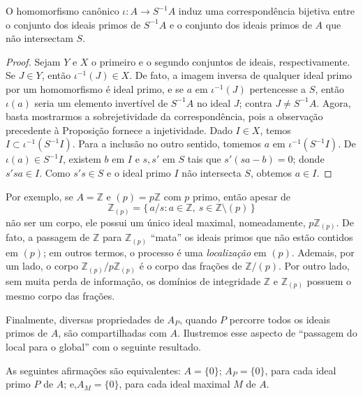 \begin{proposicao}
O homomorfismo canônico $\iota : A \to S^{-1}A$ induz uma correspondência bijetiva entre o conjunto dos ideais primos de 
$S^{-1}A$ e o conjunto dos ideais primos de $A$ que não intersectam $S$.
\end{proposicao}

\begin{proof}
Sejam $Y$ e $X$ o primeiro e o segundo conjuntos de ideais, respectivamente. Se $J \in Y$, então $\iota^{-1}(J) \in X$.
De fato, a imagem inversa de qualquer ideal primo por um homomorfismo é ideal primo, e se $a$ em $\iota^{-1}(J)$ pertencesse a $S$, 
então $\iota(a)$ seria um elemento invertível de $S^{-1}A$ no ideal $J$; contra $J \neq S^{-1}A$.
Agora, basta mostrarmos a sobrejetividade da correspondência, pois a observação precedente à Proposição fornece a injetividade.
Dado $I \in X$, temos $I \subset \iota^{-1}(S^{-1}I)$. Para a inclusão no outro sentido, tomemos $a$ em $\iota^{-1}(S^{-1}I)$.
De $\iota(a) \in S^{-1}I$, existem $b$ em $I$ e $s, s'$ em $S$ tais que $s'(sa - b) = 0$; donde $s'sa \in I$. Como $s's \in S$ 
e o ideal primo $I$ não intersecta $S$, obtemos $a \in I$.
\end{proof}

Por exemplo, se $A = \mathbb{Z}$ e $(p) = p\mathbb{Z}$ com $p$ primo, então apesar de 
\[
\mathbb{Z}_{(p)} = \{\, a/s : a \in \mathbb{Z},\ s \in \mathbb{Z} \setminus (p) \,\}
\]
não ser um corpo, ele possui um único ideal maximal, nomeadamente, $p\mathbb{Z}_{(p)}$. De fato, a passagem de 
$\mathbb{Z}$ para $\mathbb{Z}_{(p)}$ ``mata'' os ideais primos que não estão contidos em $(p)$; em outros termos, o
processo é uma \emph{localização} em $(p)$. Ademais, por um lado, o corpo $\mathbb{Z}_{(p)}/p\mathbb{Z}_{(p)}$ é o corpo 
das frações de $\mathbb{Z}/(p)$. Por outro lado, sem muita perda de informação, os domínios de integridade $\mathbb{Z}$ e 
$\mathbb{Z}_{(p)}$ possuem o mesmo corpo das frações.

Finalmente, diversas propriedades de $A_P$, quando $P$ percorre todos os
ideais primos de $A$, são compartilhadas com $A$. Ilustremos esse aspecto
de ``passagem do local para o global'' com o seguinte resultado.

\begin{proposicao}
As seguintes afirmações são equivalentes: $A = \{0\}$; $A_P = \{0\}$, para cada ideal primo $P$ de $A$; e,$A_M = \{0\}$, para 
cada ideal maximal $M$ de $A$.
\end{proposicao}

